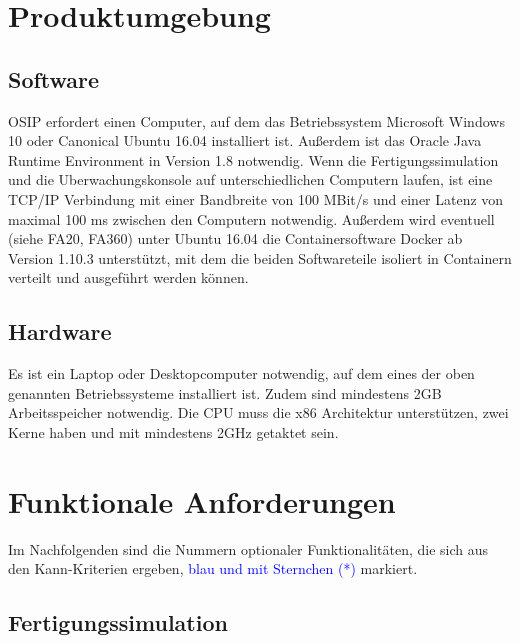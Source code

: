 \documentclass[parskip=full]{scrartcl}
\begin{document}
\pagebreak
\section{Produktumgebung}
\subsection{Software}
OSIP erfordert einen Computer, auf dem das Betriebssystem Microsoft Windows 10 oder Canonical Ubuntu 16.04 installiert ist.
Außerdem ist das Oracle Java Runtime Environment in Version 1.8
notwendig. Wenn die \gls{Fertigungssimulation} und die \gls{Uberwachungskonsole} auf unterschiedlichen Computern laufen,
ist eine \gls{TCP/IP} Verbindung mit einer Bandbreite von 100 MBit/s und einer Latenz von maximal 100 ms zwischen den Computern notwendig.
Außerdem wird eventuell (siehe FA20, FA360) unter Ubuntu 16.04 die Containersoftware Docker
ab Version 1.10.3 unterstützt, mit dem die beiden Softwareteile isoliert in Containern verteilt und ausgeführt werden können.

\subsection{Hardware}
\label{Hardware}
Es ist ein Laptop oder Desktopcomputer notwendig, auf dem eines der oben genannten Betriebssysteme installiert ist.
Zudem sind mindestens 2GB Arbeitsspeicher notwendig. Die CPU muss die x86 Architektur unterstützen, zwei Kerne haben und mit
mindestens 2GHz getaktet sein.

\pagebreak
\section{Funktionale Anforderungen}
Im Nachfolgenden sind die Nummern optionaler Funktionalitäten, die sich aus den Kann-Kriterien ergeben, \textcolor{blue}{blau und mit Sternchen (*)} markiert.

\subsection{Fertigungssimulation}
\end{document}
